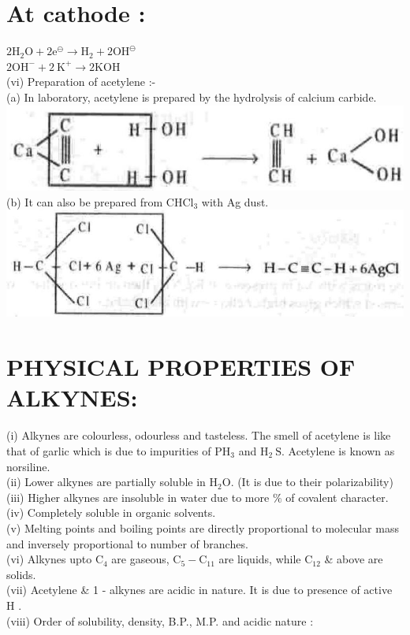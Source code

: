 \documentclass[10pt]{article}
\begin{document}
\section*{At cathode :}
$2 \mathrm{H}_{2} \mathrm{O}+2 \mathrm{e}^{\ominus} \longrightarrow \mathrm{H}_{2}+2 \mathrm{OH}^{\ominus}$\\
$2 \mathrm{OH}^{-}+2 \mathrm{~K}^{+} \longrightarrow 2 \mathrm{KOH}$\\
(vi) Preparation of acetylene :-\\
(a) In laboratory, acetylene is prepared by the hydrolysis of calcium carbide.\\
\includegraphics[max width=\textwidth, center]{2025_01_28_8470952b98110cec3aabg-188(1)}\\
(b) It can also be prepared from $\mathrm{CHCl}_{3}$ with Ag dust.\\
\includegraphics[max width=\textwidth, center]{2025_01_28_8470952b98110cec3aabg-188(2)}

\section*{PHYSICAL PROPERTIES OF ALKYNES:}
(i) Alkynes are colourless, odourless and tasteless. The smell of acetylene is like that of garlic which is due to impurities of $\mathrm{PH}_{3}$ and $\mathrm{H}_{2} \mathrm{~S}$. Acetylene is known as norsiline.\\
(ii) Lower alkynes are partially soluble in $\mathrm{H}_{2} \mathrm{O}$. (It is due to their polarizability)\\
(iii) Higher alkynes are insoluble in water due to more $\%$ of covalent character.\\
(iv) Completely soluble in organic solvents.\\
(v) Melting points and boiling points are directly proportional to molecular mass and inversely proportional to number of branches.\\
(vi) Alkynes upto $\mathrm{C}_{4}$ are gaseous, $\mathrm{C}_{5}-\mathrm{C}_{11}$ are liquids, while $\mathrm{C}_{12}$ \& above are solids.\\
(vii) Acetylene \& 1 - alkynes are acidic in nature. It is due to presence of active H .\\
(viii) Order of solubility, density, B.P., M.P. and acidic nature :
\end{document}
